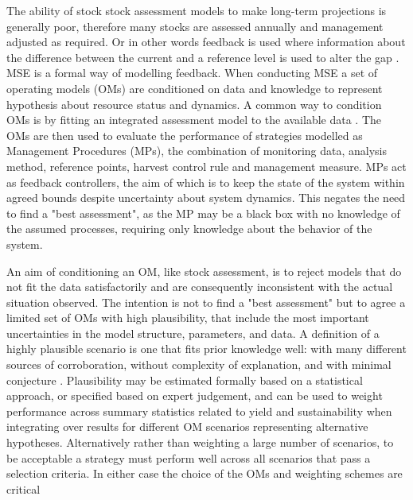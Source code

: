 \documentclass[a4paper]{article}
\begin{document}
The ability of stock stock assessment models to make long-term projections is generally poor, therefore many stocks are assessed annually and management adjusted as required. Or in other words feedback is used where information about the difference between the current and a reference level is used to alter the gap \citep{ramaprasad1983definition}. MSE is a formal way of modelling feedback. When conducting MSE a set of operating models (OMs) are conditioned on data and knowledge to represent hypothesis about resource status and dynamics. A common way to condition OMs is by fitting an integrated assessment model to the available data \citep{sharma2020trfmo}. The OMs are then used to evaluate the performance of strategies modelled as Management Procedures (MPs), the combination of monitoring data, analysis method, reference points, harvest control rule and management measure. MPs act as feedback controllers, the aim of which is to keep the state of the system within agreed bounds despite uncertainty about system dynamics. This negates the need to find a "best assessment", as the MP may be a black box with no knowledge of the assumed processes, requiring only knowledge about the behavior of the system. 

An aim of conditioning an OM, like stock assessment, is to reject models that do not fit the data satisfactorily and are consequently inconsistent with the actual situation observed. The intention is not to find a "best assessment" but to agree a limited set of OMs with high plausibility, that include the most important uncertainties in the model structure, parameters, and data. A definition of a highly plausible scenario is one that fits prior knowledge well: with many different sources of corroboration, without complexity of explanation, and with minimal conjecture \citep{Connell2006model}. Plausibility may be estimated formally based on a statistical approach, or specified based on expert judgement, and can be used to weight performance across summary statistics related to yield and sustainability when integrating over results for different OM scenarios representing alternative hypotheses. Alternatively rather than weighting a large number of scenarios, to be acceptable a strategy must perform well across all scenarios that pass a selection criteria. 
In either case the choice of the OMs and weighting schemes are critical %
\end{document}
